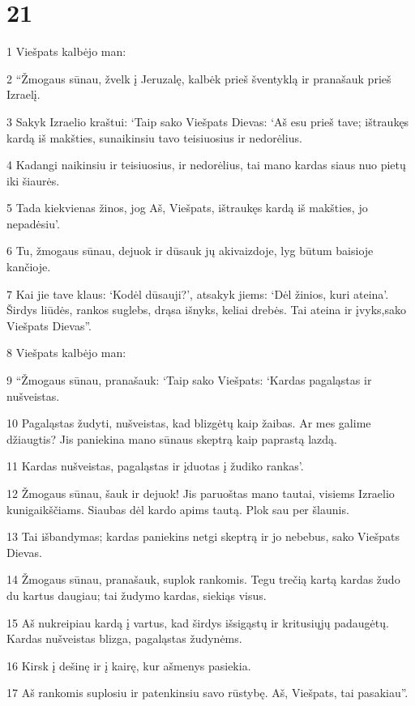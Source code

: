 \chapter{21}


\par 1 Viešpats kalbėjo man: 
\par 2 “Žmogaus sūnau, žvelk į Jeruzalę, kalbėk prieš šventyklą ir pranašauk prieš Izraelį. 
\par 3 Sakyk Izraelio kraštui: ‘Taip sako Viešpats Dievas: ‘Aš esu prieš tave; ištraukęs kardą iš makšties, sunaikinsiu tavo teisiuosius ir nedorėlius. 
\par 4 Kadangi naikinsiu ir teisiuosius, ir nedorėlius, tai mano kardas siaus nuo pietų iki šiaurės. 
\par 5 Tada kiekvienas žinos, jog Aš, Viešpats, ištraukęs kardą iš makšties, jo nepadėsiu’. 
\par 6 Tu, žmogaus sūnau, dejuok ir dūsauk jų akivaizdoje, lyg būtum baisioje kančioje. 
\par 7 Kai jie tave klaus: ‘Kodėl dūsauji?’, atsakyk jiems: ‘Dėl žinios, kuri ateina’. Širdys liūdės, rankos suglebs, drąsa išnyks, keliai drebės. Tai ateina ir įvyks,­sako Viešpats Dievas”. 
\par 8 Viešpats kalbėjo man: 
\par 9 “Žmogaus sūnau, pranašauk: ‘Taip sako Viešpats: ‘Kardas pagaląstas ir nušveistas. 
\par 10 Pagaląstas žudyti, nušveistas, kad blizgėtų kaip žaibas. Ar mes galime džiaugtis? Jis paniekina mano sūnaus skeptrą kaip paprastą lazdą. 
\par 11 Kardas nušveistas, pagaląstas ir įduotas į žudiko rankas’. 
\par 12 Žmogaus sūnau, šauk ir dejuok! Jis paruoštas mano tautai, visiems Izraelio kunigaikščiams. Siaubas dėl kardo apims tautą. Plok sau per šlaunis. 
\par 13 Tai išbandymas; kardas paniekins netgi skeptrą ir jo nebebus,­ sako Viešpats Dievas.­ 
\par 14 Žmogaus sūnau, pranašauk, suplok rankomis. Tegu trečią kartą kardas žudo du kartus daugiau; tai žudymo kardas, siekiąs visus. 
\par 15 Aš nukreipiau kardą į vartus, kad širdys išsigąstų ir kritusiųjų padaugėtų. Kardas nušveistas blizga, pagaląstas žudynėms. 
\par 16 Kirsk į dešinę ir į kairę, kur ašmenys pasiekia. 
\par 17 Aš rankomis suplosiu ir patenkinsiu savo rūstybę. Aš, Viešpats, tai pasakiau”. 
